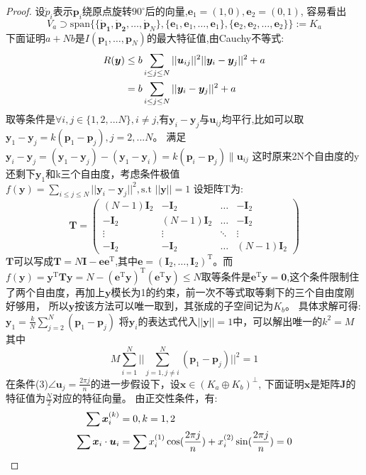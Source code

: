 \begin{proof}
设$\mathring{p}_i$表示$\bm{p}_i$绕原点旋转$90^{\circ}$后的向量,$\bm{e}_1=(1,0),\bm{e}_2=(0,1)$,
容易看出
\[
V_a \supset\text{span}\{\{\bm{\mathring{p}_1},\bm{\mathring{p}_2},\dots,\bm{\mathring{p}} _N\},\{\bm{e}_1,\bm{e}_1,\dots,\bm{e}_1\},\{\bm{e}_2,\bm{e}_2,\dots,\bm{e}_2\}\}:=K_a
\]
下面证明$a+Nb$是$I(\bm{p}_1,\dots,\bm{p}_N)$的最大特征值,由Cauchy不等式:
\begin{align}\notag
R(\bm{y})&\leq b\sum_{i\leq j\leq N} ||\bm{u}_{ij}||^2||\bm{y}_i-\bm{y}_j||^2+a\\
&=b\sum_{i\leq j\leq N}||\bm{y}_i-\bm{y}_j||^2+a
\end{align}
取等条件是$\forall i,j\in \{1,2,...N\},i\neq j$,有$\bm{y}_i-\bm{y}_j$与$\bm{u}_{ij}$均平行,比如可以取
$\bm{y}_1-\bm{y}_j=k(\bm{p}_1-\bm{p}_j),j=2,...N$。
满足
$\bm{y}_i-\bm{y}_j=(\bm{y}_1-\bm{y}_j)-(\bm{y}_1-\bm{y}_i)
=k(\bm{p}_i-\bm{p}_j)\parallel \bm{u}_{ij}$
这时原来2N个自由度的y还剩下$\bm{y}_1$和k三个自由度，考虑条件极值
$f(\bm{y})=\sum_{i\leq j\leq N} ||\bm{y}_i-\bm{y}_j||^2,\text{s.t } ||\bm{y}||=1$
设矩阵T为:
\[
\bm{T}=\left(
\begin{array}{cccc}
(N-1)\bm{I}_2&-\bm{I}_2&\dots&-\bm{I}_2\\
-\bm{I}_2&(N-1)\bm{I}_2&\dots&-\bm{I}_2\\
\vdots & \vdots & \ddots & \vdots\\
-\bm{I}_2& -\bm{I}_2 & \dots & (N-1)\bm{I}_2
\end{array}
\right)
\]
$\bm{T}$可以写成$\bm{T}=N\bm{I}-\bm{e}\bm{e}^{\textrm{T}} $,其中$\bm{e}=(\bm{I}_2,\dots,\bm{I}_2)^{\textrm{T}} $。而$f(\bm{y})=\bm{y}^{\textrm{T}} \bm{T}\bm{y}=N-(\bm{e}^{\textrm{T}} \bm{y})^{\textrm{T}} (\bm{e}^{\textrm{T}} \bm{y})\leq N$取等条件是$\bm{e}^{\textrm{T}} \bm{y}=\bm{0}$,这个条件限制住了两个自由度，再加上$\bm{y}$模长为1的约束，前一次不等式取等剩下的三个自由度刚好够用，
所以$\bm{y}$按该方法可以唯一取到，其张成的子空间记为$K_b$。
具体求解可得:
$\bm{y}_1=\frac{k}{N}\sum_{j=2}^N (\bm{p}_1-\bm{p}_j)$
将$\bm{y}_i$的表达式代入$||\bm{y}||=1$中，可以解出唯一的$k^2=M$
其中
\[
M\sum_{i=1}^N||\sum_{j=1,j\neq i}^N(\bm{p}_1-\bm{p}_j)||^2=1
\]
  在条件(3)$\angle\bm{u}_j=\frac{2\pi j}{n}$的进一步假设下，设$\bm{x}\in (K_a\oplus K_b)^{\bot}$,
  下面证明$\bm{x}$是矩阵$\bm{J}$的特征值为$\frac{N}{2}$对应的特征向量。
  由正交性条件，有:
\begin{align}\notag
\sum \bm{x}_i^{(k)}&=0,k=1,2\\
\sum \bm{x}_i \cdot \bm{u}_i&=\sum x_i^{(1)} \cos(\frac{2\pi j}{n})+x_i^{(2)} \sin(\frac{2\pi j}{n})=0

\end{align}
\end{proof}
